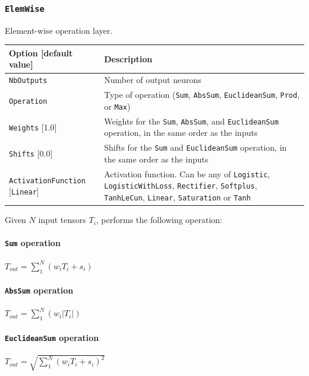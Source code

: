 \documentclass[a4paper,11pt,oneside]{article}
\begin{document}
\subsubsection{\texorpdfstring{%
\lstinline[basicstyle=\ttfamily\bfseries]!ElemWise!}{ElemWise}}
Element-wise operation layer.

\begin{center}
 \begin{longtable}{| p{5cm} | p{10cm} | }
 \hline
 Option [default value] & Description\\
 \hline\hline
  \cellcolor{requiredcolor}\lstinline!NbOutputs! & Number of output neurons \\
  \cellcolor{requiredcolor}\lstinline!Operation! & Type of operation
  (\lstinline!Sum!, \lstinline!AbsSum!, \lstinline!EuclideanSum!,
  \lstinline!Prod!, or \lstinline!Max!)\\
  \lstinline!Weights! [1.0] & Weights for the \lstinline!Sum!, \lstinline!AbsSum!,
  and \lstinline!EuclideanSum! operation, in the same order as the inputs \\
  \lstinline!Shifts! [0.0] & Shifts for the \lstinline!Sum! and \lstinline!EuclideanSum!
  operation, in the same order as the inputs \\
  \lstinline!ActivationFunction! [\lstinline!Linear!] & Activation function.
  Can be any of \lstinline!Logistic!,  \lstinline!LogisticWithLoss!,
  \lstinline!Rectifier!, \lstinline!Softplus!, \lstinline!TanhLeCun!,
  \lstinline!Linear!, \lstinline!Saturation! or \lstinline!Tanh! \\
 \hline
\end{longtable}
\end{center}

Given $N$ input tensors $T_{i}$, performs the following operation:

\paragraph{\texorpdfstring{%
\lstinline[basicstyle=\ttfamily\bfseries]!Sum! operation}{Sum operation}}
$T_{out} = \sum_{1}^{N}(w_{i} T_{i} + s_{i})$

\paragraph{\texorpdfstring{%
\lstinline[basicstyle=\ttfamily\bfseries]!AbsSum! operation}{AbsSum operation}}
$T_{out} = \sum_{1}^{N}(w_{i} |T_{i}|)$

\paragraph{\texorpdfstring{%
\lstinline[basicstyle=\ttfamily\bfseries]!EuclideanSum! operation}{EuclideanSum operation}}
$T_{out} = \sqrt{\sum_{1}^{N}\left(w_{i} T_{i} + s_{i}\right)^{2}}$
\end{document}
